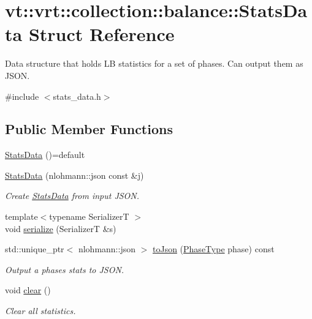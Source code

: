 \hypertarget{structvt_1_1vrt_1_1collection_1_1balance_1_1_stats_data}{}\section{vt\+:\+:vrt\+:\+:collection\+:\+:balance\+:\+:Stats\+Data Struct Reference}
\label{structvt_1_1vrt_1_1collection_1_1balance_1_1_stats_data}


Data structure that holds LB statistics for a set of phases. Can output them as J\+S\+ON.  




{\ttfamily \#include $<$stats\+\_\+data.\+h$>$}

\subsection*{Public Member Functions}
\begin{DoxyCompactItemize}
\item 
\hyperlink{structvt_1_1vrt_1_1collection_1_1balance_1_1_stats_data_a4456eb9f50cab15ee7cbd079603a4b6d}{Stats\+Data} ()=default
\item 
\hyperlink{structvt_1_1vrt_1_1collection_1_1balance_1_1_stats_data_abcae1ce289482ae58eab2beb9a4ac013}{Stats\+Data} (nlohmann\+::json const \&j)
\begin{DoxyCompactList}\small\item\em Create {\ttfamily \hyperlink{structvt_1_1vrt_1_1collection_1_1balance_1_1_stats_data}{Stats\+Data}} from input J\+S\+ON. \end{DoxyCompactList}\item 
{\footnotesize template$<$typename SerializerT $>$ }\\void \hyperlink{structvt_1_1vrt_1_1collection_1_1balance_1_1_stats_data_a333902a2dd2dd9d8a9471f51a5d94e5f}{serialize} (SerializerT \&s)
\item 
std\+::unique\+\_\+ptr$<$ nlohmann\+::json $>$ \hyperlink{structvt_1_1vrt_1_1collection_1_1balance_1_1_stats_data_ac864e580e764d093b427e459d46b2bd4}{to\+Json} (\hyperlink{namespacevt_a46ce6733d5cdbd735d561b7b4029f6d7}{Phase\+Type} phase) const
\begin{DoxyCompactList}\small\item\em Output a phase\textquotesingle{}s stats to J\+S\+ON. \end{DoxyCompactList}\item 
void \hyperlink{structvt_1_1vrt_1_1collection_1_1balance_1_1_stats_data_a48628fce8e2356413520fed69a800bc4}{clear} ()
\begin{DoxyCompactList}\small\item\em Clear all statistics. \end{DoxyCompactList}\end{DoxyCompactItemize}
